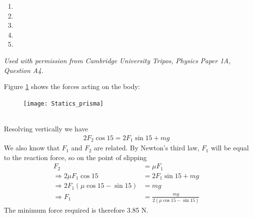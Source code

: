
\begin{problem} 
 {

\begin{enumerate}
\item {}\correct
\item {}
\item {}
\item {}
\item {}
\end{enumerate}
}
{\textit{Used with permission from Cambridge University Tripos, Physics Paper 1A, Question A4.}}
{
Figure \ref{fig:Statics_prisma} shows the forces acting on the body:
\begin{figure}[h]
\centering
\texttt{[image: Statics\_prisma]}
\caption{}
\label{fig:Statics_prisma}
\end{figure}
\\
Resolving vertically we have
\begin{align*}
2F_2\cos{15}=2F_1\sin{15}+mg
\end{align*}
We also know that $F_1$ and $F_2$ are related. By Newton's third law, $F_1$ will be equal to the reaction force, so on the point of slipping
\begin{align*}
F_2&=\mu F_1 \\
\Rightarrow 2\mu F_1\cos{15}&=2F_1\sin{15}+mg \\
\Rightarrow 2F_1\left(\mu\cos{15}-\sin{15}\right)&=mg \\
\Rightarrow F_1&=\frac{mg}{2\left(\mu\cos{15}-\sin{15}\right)}
\end{align*}
The minimum force required is therefore 3.85 N. 
}
\end{problem}